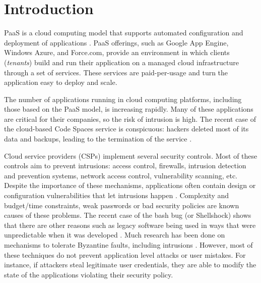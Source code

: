 
\section{Introduction}
\label{sec:introduction}

\acf{PaaS} is a cloud computing model that supports automated configuration and deployment of applications \cite{Vaquero2008,Vaquero2011}. \ac{PaaS} offerings, such as Google App Engine, Windows Azure, and Force.com, provide an environment  in which clients (\textit{tenants}) build and run their application on a managed cloud infrastructure through a set of services. These services are paid-per-usage and turn the application easy to deploy and scale.

The number of applications running in cloud computing platforms, including those based on the \ac{PaaS} model, is increasing rapidly. Many of these applications are critical for their companies, so the risk of intrusion is high. The recent case of the cloud-based Code Spaces service is conspicuous: hackers deleted most of its data and backups, leading to the termination of the service \cite{McAllister:14}.


Cloud service providers (CSPs) implement several security controls. Most of these controls aim to prevent intrusions: access control, firewalls, intrusion detection and prevention systems, network access control, vulnerability scanning, etc. Despite the importance of these mechanisms, applications often contain design or configuration vulnerabilities that let intrusions happen \cite{Williams2013}. Complexity and budget/time constraints, weak  passwords or bad security policies are known causes of these problems. The recent case of the bash bug (or Shellshock) shows that there are other reasons such as legacy software being used in ways that were unpredictable when it was developed \cite{Sidhpurwala:14}.
Much research has been done on mechanisms to tolerate Byzantine faults, including intrusions \cite{Verissimo2003}. However, most of these techniques do not prevent application level attacks or user mistakes. For instance, if attackers steal legitimate user credentials, they are able to modify the state of the applications violating their security policy. 


